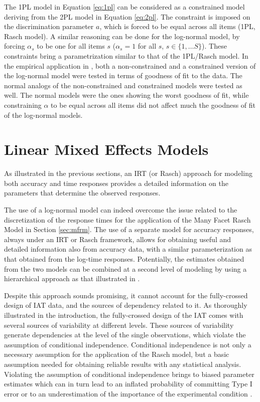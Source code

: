 \documentclass[12pt]{book}
\begin{document}
The 1PL model in Equation \ref{eq:1pl} can be considered as a constrained model deriving from the 2PL model in Equation \ref{eq:2pl}. 
The constraint is imposed on the discrimination parameter $a$, which is forced to be equal across all items (1PL, Rasch model). 
A similar reasoning can be done for the log-normal model, by forcing $\alpha_s$ to be one for all items $s$ ($\alpha_s = 1$ for all $s$, $s \in \{1, \ldots S\}$).
These constraints bring a parametrization similar to that of the 1PL/Rasch model.
In the empirical application in , both a non-constrained and a constrained version of the log-normal model were tested in terms of goodness of fit to the data. 
The normal analogs of the non-constrained and constrained models were tested as well. 
The normal models were the ones showing the worst goodness of fit, while constraining $\alpha$ to be equal across all items did not affect much the  goodness of fit of the log-normal models. 


\section{Linear Mixed Effects Models}

As illustrated in the previous sections, an IRT (or Rasch) approach for modeling both accuracy and  time responses provides a detailed information on the parameters that determine the observed responses. 


The use of a log-normal model can indeed overcome the issue related to the discretization of the response times for the application of the Many Facet Rasch Model in Section \ref{sec:mfrm}. 
The use of a separate model for accuracy responses, always under an IRT or Rasch framework, allows for obtaining useful and detailed information also from accuracy data, with a similar parameterization as that obtained from the log-time responses. 
Potentially, the estimates obtained from the two models can be combined at a second level of modeling by using a hierarchical approach as that illustrated in . 

Despite this approach sounds promising, it cannot account for the fully-crossed design of IAT data, and the sources of dependency related to it. As thoroughly illustrated in the introduction, the fully-crossed design of the IAT comes with several sources of variability at different levels. These sources of variability generate dependencies at the level of the single observations, which violate the assumption of conditional independence. 
Conditional independence is not only a necessary assumption for the application of the Rasch model, but a basic assumption needed for obtaining reliable results with any statistical analysis.
Violating the assumption of conditional independence brings to biased parameter estimates which can in turn lead to an inflated probability of committing Type I error or to an underestimation of the importance of the experimental condition \cite{Barr2013, judd2012,mc1989}. 
\end{document}
